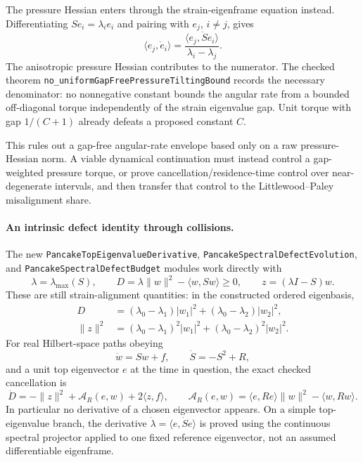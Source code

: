 \documentclass[11pt]{article}
\theoremstyle{definition}
\begin{document}
The pressure Hessian enters through the strain-eigenframe equation instead.
Differentiating $Se_i=\lambda_i e_i$ and pairing with $e_j$, $i\ne j$, gives
\[
  \langle e_j,\dot e_i\rangle
   =\frac{\langle e_j,\dot S e_i\rangle}{\lambda_i-\lambda_j}.
\]
The anisotropic pressure Hessian contributes to the numerator.  The checked
theorem \texttt{no\_uniformGapFreePressureTiltingBound} records the necessary
denominator: no nonnegative constant bounds the angular rate from a bounded
off-diagonal torque independently of the strain eigenvalue gap.  Unit torque
with gap $1/(C+1)$ already defeats a proposed constant $C$.

This rules out a gap-free angular-rate envelope based only on a raw
pressure-Hessian norm.  A viable
dynamical continuation must instead control a gap-weighted pressure torque,
or prove cancellation/residence-time control over near-degenerate intervals,
and then transfer that control to the Littlewood--Paley misalignment share.

\paragraph{An intrinsic defect identity through collisions.}
The new \texttt{PancakeTopEigenvalueDerivative},
\texttt{PancakeSpectralDefectEvolution}, and
\texttt{PancakeSpectralDefectBudget} modules work directly with
\[
 \lambda=\lambda_{\max}(S),\qquad
 D=\lambda\|w\|^2-\langle w,Sw\rangle\ge0,\qquad
 z=(\lambda I-S)w.
\]
These are still strain-alignment quantities: in the constructed ordered
eigenbasis,
\begin{align*}
 D&=(\lambda_0-\lambda_1)|w_1|^2
       +(\lambda_0-\lambda_2)|w_2|^2,\\
 \|z\|^2&=(\lambda_0-\lambda_1)^2|w_1|^2
       +(\lambda_0-\lambda_2)^2|w_2|^2.
\end{align*}
For real Hilbert-space paths obeying
\[
 \dot w=Sw+f,\qquad \dot S=-S^2+R,
\]
and a unit top eigenvector $e$ at the time in question, the exact checked
cancellation is
\begin{equation}\label{eq:ns-spectral-defect-rate}
 \dot D=-\|z\|^2+\mathcal A_R(e,w)+2\langle z,f\rangle,
 \qquad
 \mathcal A_R(e,w)=\langle e,Re\rangle\|w\|^2-\langle w,Rw\rangle.
\end{equation}
In particular no derivative of a chosen eigenvector appears. On a simple
top-eigenvalue branch, the derivative
$\dot\lambda=\langle e,\dot S e\rangle$ is proved using the continuous
spectral projector applied to one fixed reference eigenvector, not an
assumed differentiable eigenframe.
\end{document}
